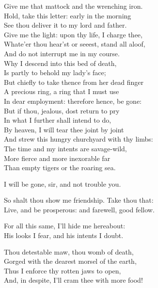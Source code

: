 \begin{speech}
Give me that mattock and the wrenching iron. \\
Hold, take this letter: early in the morning \\
See thou deliver it to my lord and father. \\
Give me the light: upon thy life, I charge thee, \\
Whate'er thou hear'st or seeest, stand all aloof, \\
And do not interrupt me in my course. \\
Why I descend into this bed of death, \\
Is partly to behold my lady's face; \\
But chiefly to take thence from her dead finger \\
A precious ring, a ring that I must use \\
In dear employment: therefore hence, be gone: \\
But if thou, jealous, dost return to pry \\
In what I further shall intend to do, \\
By heaven, I will tear thee joint by joint \\
And strew this hungry churchyard with thy limbs: \\
The time and my intents are savage-wild, \\
More fierce and more inexorable far \\
Than empty tigers or the roaring sea. \\
\end{speech}
\begin{speech}
I will be gone, sir, and not trouble you. \\
\end{speech}
\begin{speech}
So shalt thou show me friendship. Take thou that:
\\
Live, and be prosperous: and farewell, good fellow. \\
\end{speech}
\begin{speech}
 For all this same, I'll hide me hereabout:
\\
His looks I fear, and his intents I doubt. 
\\
\end{speech}
\begin{speech}
Thou detestable maw, thou womb of death, \\
Gorged with the dearest morsel of the earth, \\
Thus I enforce thy rotten jaws to open, \\
And, in despite, I'll cram thee with more food!  \\
\end{speech}
